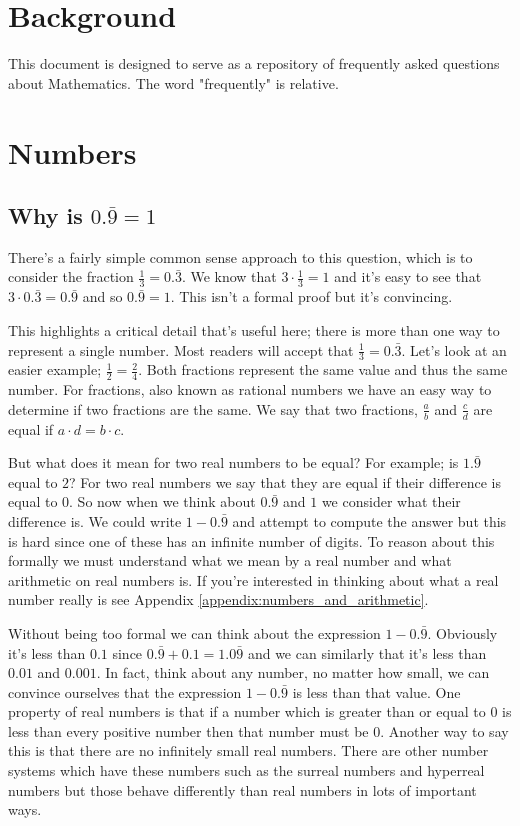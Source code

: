 \documentclass[oneside]{book}
\begin{document}
\mainmatter
\begin{spacing}{1.618}
\chapter{Background}
This document is designed to serve as a repository of frequently asked questions about Mathematics. The word "frequently" is relative. 

\chapter{Numbers}
\section{Why is $0.\bar{9}=1$}
There's a fairly simple common sense approach to this question, which is to consider the fraction $\frac{1}{3}=0.\bar{3}$. We know that $3\cdot \frac{1}{3}=1$ and it's easy to see that $3\cdot 0.\bar{3}=0.\bar{9}$ and so $0.\bar{9}=1$. This isn't a formal proof but it's convincing. 

This highlights a critical detail that's useful here; there is more than one way to represent a single number. Most readers will accept that $\frac{1}{3}=0.\bar{3}$. Let's look at an easier example; $\frac{1}{2}=\frac{2}{4}$. Both fractions represent the same value and thus the same number. For fractions, also known as rational numbers we have an easy way to determine if two fractions are the same. We say that two fractions, $\frac{a}{b}$ and $\frac{c}{d}$ are equal if $a\cdot d=b\cdot c$. 

But what does it mean for two real numbers to be equal? For example; is $1.\bar{9}$ equal to $2$? For two real numbers we say that they are equal if their difference is equal to $0$. So now when we think about $0.\bar{9}$ and $1$ we consider what their difference is. We could write $1-0.\bar{9}$ and attempt to compute the answer but this is hard since one of these has an infinite number of digits. To reason about this formally we must understand what we mean by a real number and what arithmetic on real numbers is. If you're interested in thinking about what a real number really is see Appendix \ref{appendix:numbers_and_arithmetic}. 

Without being too formal we can think about the expression $1-0.\bar{9}$. Obviously it's less than $0.1$ since $0.\bar{9}+0.1=1.0\bar{9}$ and we can similarly that it's less than $0.01$ and $0.001$. In fact, think about any number, no matter how small, we can convince ourselves that the expression $1-0.\bar{9}$ is less than that value. One property of real numbers is that if a number which is greater than or equal to 0 is less than every positive number then that number must be $0$. Another way to say this is that there are no infinitely small real numbers. There are other number systems which have these numbers such as the surreal numbers and hyperreal numbers but those behave differently than real numbers in lots of important ways. 


\end{spacing}
\end{document}
